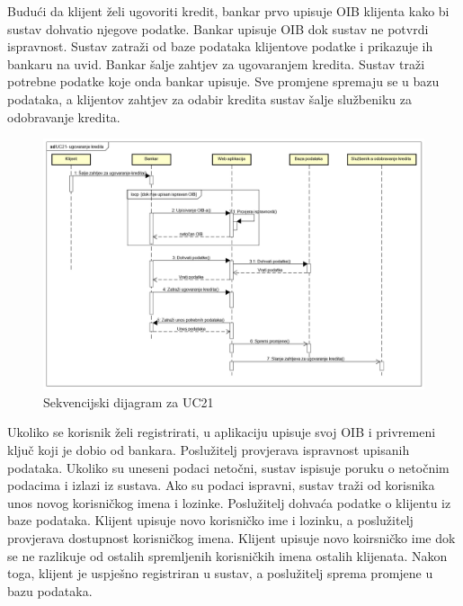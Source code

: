 			
			
			Budući da klijent želi ugovoriti kredit, bankar prvo upisuje OIB klijenta kako bi sustav dohvatio njegove podatke. Bankar upisuje OIB dok sustav ne potvrdi ispravnost. Sustav zatraži od baze podataka klijentove podatke i prikazuje ih bankaru na uvid. Bankar šalje zahtjev za ugovaranjem kredita. Sustav traži potrebne podatke koje onda bankar upisuje. Sve promjene spremaju se u bazu podataka, a klijentov zahtjev za odabir kredita sustav šalje službeniku za odobravanje kredita.
			\eject
			
			\begin{figure}[H]
				\includegraphics[scale=0.43]{slike/UC21- ugovaranje kredita.PNG}
				\centering
				\caption{Sekvencijski dijagram za UC21}
				\label{fig:uc21}
			\end{figure}
			\eject
			
			
			
			Ukoliko se korisnik želi registrirati, u aplikaciju upisuje svoj OIB i privremeni ključ koji je dobio od bankara. Poslužitelj provjerava ispravnost upisanih podataka. Ukoliko su uneseni podaci netočni, sustav ispisuje poruku o netočnim podacima i izlazi iz sustava. Ako su podaci ispravni, sustav traži od korisnika unos novog korisničkog imena i lozinke. Poslužitelj dohvaća podatke o klijentu iz baze podataka. Klijent upisuje novo korisničko ime i lozinku, a poslužitelj provjerava dostupnost korisničkog imena. Klijent upisuje novo koirsničko ime dok se ne razlikuje od ostalih spremljenih korisničkih imena ostalih klijenata. Nakon toga, klijent je uspješno registriran u sustav, a poslužitelj sprema promjene u bazu podataka.
			\eject
			

